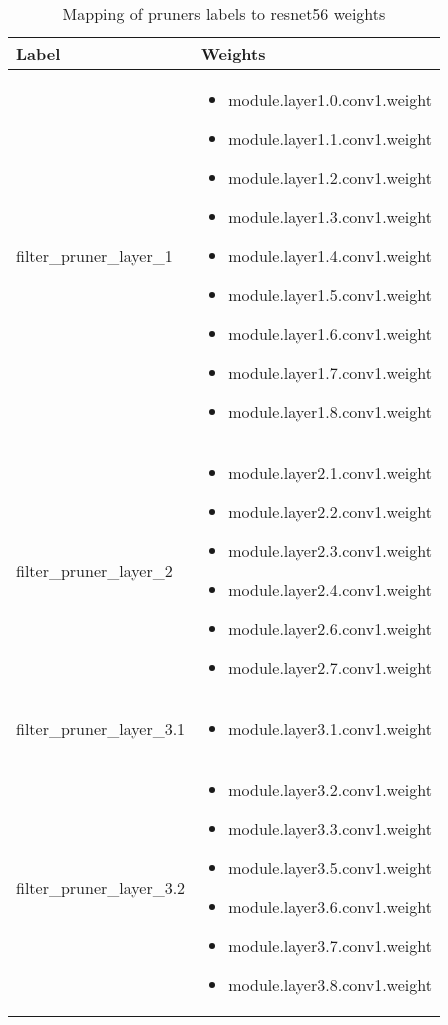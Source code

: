 \documentclass[../Dissertation.tex]{subfiles}
\begin{document}
\singlespacing
\begin{table}[H]
    \centering
    \setlength{\extrarowheight}{0.5pt}
    \setlength{\tabcolsep}{3pt}
    \begin{tabularx}{0.6\textwidth}{|p{40mm}|*{1}{>{\compress\RaggedRight\arraybackslash} X |}}
    \hline
    Label & Weights  \\
    \hline
    filter\_pruner\_layer\_1
    & \begin{itemize}
        \item module.layer1.0.conv1.weight
        \item module.layer1.1.conv1.weight
        \item module.layer1.2.conv1.weight
        \item module.layer1.3.conv1.weight
        \item module.layer1.4.conv1.weight
        \item module.layer1.5.conv1.weight
        \item module.layer1.6.conv1.weight
        \item module.layer1.7.conv1.weight
        \item module.layer1.8.conv1.weight
    \end{itemize} \\ 
    \hline
    filter\_pruner\_layer\_2 
    & \begin{itemize}
        \item module.layer2.1.conv1.weight
        \item module.layer2.2.conv1.weight
        \item module.layer2.3.conv1.weight
        \item module.layer2.4.conv1.weight
        \item module.layer2.6.conv1.weight
        \item module.layer2.7.conv1.weight
    \end{itemize} \\ 
    \hline
    filter\_pruner\_layer\_3.1
    & \begin{itemize}
        \item module.layer3.1.conv1.weight
    \end{itemize} \\
    \hline
    filter\_pruner\_layer\_3.2
    & \begin{itemize}
        \item module.layer3.2.conv1.weight
        \item module.layer3.3.conv1.weight
        \item module.layer3.5.conv1.weight
        \item module.layer3.6.conv1.weight
        \item module.layer3.7.conv1.weight
        \item module.layer3.8.conv1.weight
    \end{itemize}\\ \hline
    \end{tabularx}
    \caption{Mapping of pruners labels to resnet56 weights}
    \label{tab:scheduleWeights}
\end{table}
\end{document}
